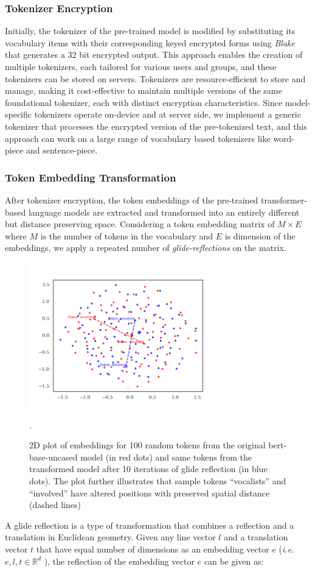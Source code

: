 \documentclass[letterpaper]{article} %
\begin{document}
\subsubsection{Tokenizer Encryption}
Initially, the tokenizer of the pre-trained model is modified by substituting its vocabulary items with their corresponding keyed encrypted forms using \textit{Blake} that generates a 32 bit encrypted output. This approach enables the creation of multiple tokenizers, each tailored for various users and groups, and these tokenizers can be stored on servers. Tokenizers are resource-efficient to store and manage, making it cost-effective to maintain multiple versions of the same foundational tokenizer, each with distinct encryption characteristics. Since model-specific tokenizers operate on-device and at server side, we implement a generic tokenizer that processes the encrypted version of the pre-tokenized text, and this approach can work on a large range of vocabulary based tokenizers like word-piece and sentence-piece.
\subsubsection{Token Embedding Transformation}
After tokenizer encryption, the token embeddings of the pre-trained transformer-based language models are extracted and transformed into an entirely different but distance preserving space. Considering a token embedding matrix of $M \times E$ where $M$ is the number of tokens in the vocabulary and $E$ is dimension of the embeddings, we apply a repeated number of \emph{glide-reflections} on the matrix. 
\begin{figure}[t]
    \centering
    \includegraphics[width=8.4cm]{embedding_plot-2.png}
    \caption{2D plot of embeddings for 100 random tokens from the original bert-base-uncased model (in red dots) and same tokens from the transformed model after 10 iterations of glide reflection (in blue dots). The plot further illustrates that sample tokens ``vocalists'' and ``involved'' have altered positions with  preserved spatial distance (dashed lines)}.
    \label{fig:glide}
\end{figure}
A glide reflection is a type of transformation that combines a reflection and a translation in Euclidean geometry. Given any line vector $l$ and a translation vector $t$ that have equal number of dimensions as an embedding vector $e$ (\textit{i.e.} $e,l,t  \in \mathbb{R}^d$ ), the reflection of the embedding vector $e$ can be given as:
\end{document}
